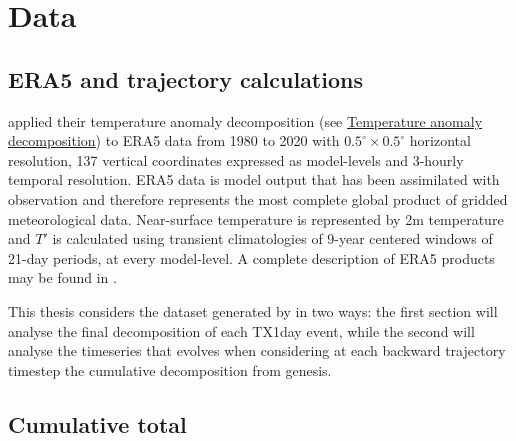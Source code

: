 \documentclass[11pt,a4paper,twoside,openright]{report}
\theoremstyle{definition}
\begin{document}
\chapter{Data}\label{data}

\section{ERA5 and trajectory calculations}\label{era5-and-trajectory-calculations}

\cite{rothlisberger_quantifying_2023} applied their temperature anomaly decomposition (see \hyperref[temperature-anomaly-decomposition]{Temperature anomaly decomposition}) to ERA5 data from 1980 to 2020 with \(0.5^{\circ} \times 0.5^{\circ}\) horizontal resolution, 137 vertical coordinates expressed as model-levels and 3-hourly temporal resolution. ERA5 data is model output that has been assimilated with observation and therefore represents the most complete global product of gridded meteorological data. Near-surface temperature is represented by 2m temperature and \(T'\) is calculated using transient climatologies of 9-year centered windows of 21-day periods, at every model-level. A complete description of ERA5 products may be found in \cite{hersbach_era5_2020}.

This thesis considers the dataset generated by \cite{rothlisberger_quantifying_2023} in two ways: the first section will analyse the final decomposition of each TX1day event, while the second will analyse the timeseries that evolves when considering at each backward trajectory timestep the cumulative decomposition from genesis.

\section{Cumulative total}\label{cumulative-total}
\end{document}
